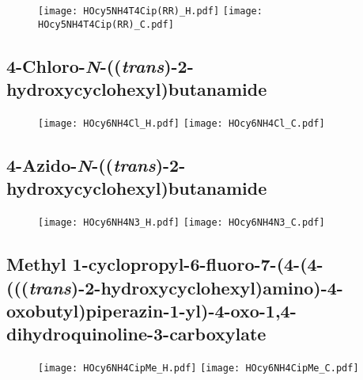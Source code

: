 \begin{figure}[H]
	\centering
		\texttt{[image: HOcy5NH4T4Cip(RR)\_H.pdf]}
		\texttt{[image: HOcy5NH4T4Cip(RR)\_C.pdf]}
\end{figure}

\subsection{4\hyp{}Chloro\hyp{}\textit{N}\hyp{}((\textit{trans})\hyp{}2\hyp{}hydroxycyclohexyl)butanamide  }

\begin{figure}[H]
	\centering
		\texttt{[image: HOcy6NH4Cl\_H.pdf]}
		\texttt{[image: HOcy6NH4Cl\_C.pdf]}
\end{figure}

\subsection{4\hyp{}Azido\hyp{}\textit{N}\hyp{}((\textit{trans})\hyp{}2\hyp{}hydroxycyclohexyl)butanamide  }

\begin{figure}[H]
	\centering
		\texttt{[image: HOcy6NH4N3\_H.pdf]}
		\texttt{[image: HOcy6NH4N3\_C.pdf]}
\end{figure}

\subsection{Methyl 1\hyp{}cyclopropyl\hyp{}6\hyp{}fluoro\hyp{}7\hyp{}(4\hyp{}(4\hyp{}(((\textit{trans})\hyp{}2\hyp{}hydroxycyclohexyl)amino)\hyp{}4\hyp{}oxobutyl)piperazin\hyp{}1\hyp{}yl)\hyp{}4\hyp{}oxo\hyp{}1,4\hyp{}dihydroquinoline\hyp{}3\hyp{}carboxylate }

\begin{figure}[H]
	\centering
		\texttt{[image: HOcy6NH4CipMe\_H.pdf]}
		\texttt{[image: HOcy6NH4CipMe\_C.pdf]}
\end{figure}

